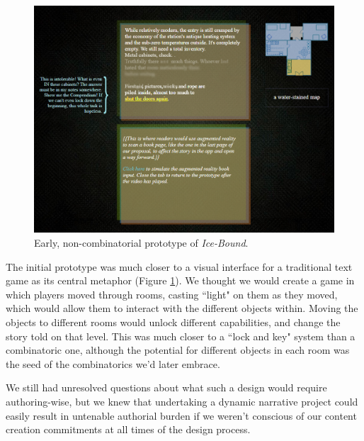 
\begin{figure}
    \centering
    \includegraphics[width=\textwidth]{figures/2-Ice-Bound/digital-prototype.png}
    \caption{Early, non-combinatorial prototype of \textit{Ice-Bound}.}
    \label{fig:digital-prototype}
\end{figure}


The initial prototype was much closer to a visual interface for a traditional text game as its central metaphor (Figure \ref{fig:digital-prototype}). We thought we would create a game in which players moved through rooms, casting ``light" on them as they moved, which would allow them to interact with the different objects within. Moving the objects to different rooms would unlock different capabilities, and change the story told on that level. This was much closer to a ``lock and key" system than a combinatoric one, although the potential for different objects in each room was the seed of the combinatorics we'd later embrace.

We still had unresolved questions about what such a design would require authoring-wise, but we knew that undertaking a dynamic narrative project could easily result in untenable authorial burden if we weren't conscious of our content creation commitments at all times of the design process.

